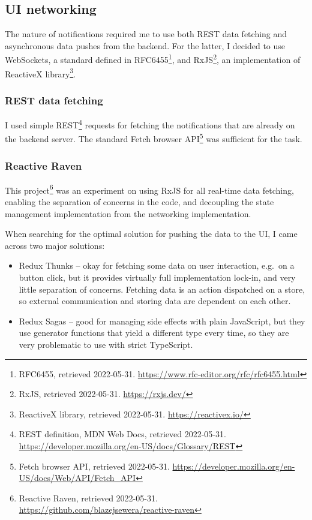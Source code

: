 \subsection{UI networking}\label{ui-networking}

The nature of notifications required me to use both REST data fetching
and asynchronous data pushes from the backend. For the latter, I decided
to use WebSockets, a standard defined in RFC6455\footnote{RFC6455,
retrieved 2022-05-31.
\url{https://www.rfc-editor.org/rfc/rfc6455.html}}, and
RxJS\footnote{RxJS, retrieved 2022-05-31. \url{https://rxjs.dev/}}, an
implementation of ReactiveX library\footnote{ReactiveX library,
retrieved 2022-05-31. \url{https://reactivex.io/}}.

\subsubsection{REST data fetching}\label{rest-data-fetching}

I used simple REST\footnote{REST definition, MDN Web Docs, retrieved
2022-05-31.
\url{https://developer.mozilla.org/en-US/docs/Glossary/REST}} requests
for fetching the notifications that are already on the backend server.
The standard Fetch browser API\footnote{Fetch browser API, retrieved
2022-05-31.
\url{https://developer.mozilla.org/en-US/docs/Web/API/Fetch_API}} was
sufficient for the task.

\subsubsection{Reactive Raven}\label{reactive-raven}

This project\footnote{Reactive Raven, retrieved 2022-05-31.
\url{https://github.com/blazejsewera/reactive-raven}} was an
experiment on using RxJS for all real-time data fetching, enabling the
separation of concerns in the code, and decoupling the state management
implementation from the networking implementation.

When searching for the optimal solution for pushing the data to the UI,
I came across two major solutions:

\begin{itemize}
  \item
    Redux Thunks -- okay for fetching some data on user interaction,
    e.g.~on a button click, but it provides virtually full implementation
    lock-in, and very little separation of concerns. Fetching data is an
    action dispatched on a store, so external communication and storing
    data are dependent on each other.
  \item
    Redux Sagas -- good for managing side effects with plain JavaScript,
    but they use generator functions that yield a different type every
    time, so they are very problematic to use with strict TypeScript.
\end{itemize}

